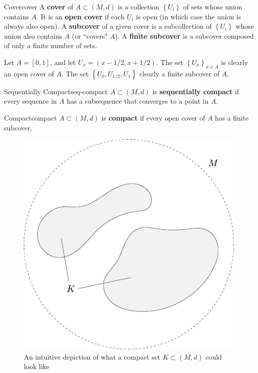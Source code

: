 \documentclass[10pt]{report}
\begin{document}
\begin{defn}{Cover}{cover}
	A \textbf{cover} of $A \subset (M,d)$ is a collection $\left\{ U_i \right\}$ of sets whose union contains $A$. It is an \textbf{open cover} if each $U_i$ is open (in which case the union is always also open). A \textbf{subcover} of a given cover is a subcollection of $\left\{ U_i \right\}$ whose union also contains $A$ (or ``covers" $A$). A \textbf{finite subcover} is a subcover composed of only a finite number of sets.
\end{defn}

\begin{ex}{}{}
	Let $A=[0,1]$, and let $U_x = (x-1/2, x+1/2)$. The set $\left\{ U_x \right\}_{x\in A}$ is clearly an open cover of $A$. The set $\left\{ U_0,U_{1/2},U_1 \right\}$ clearly a finite subcover of $A$.
\end{ex}

\begin{defn}{Sequentially Compact}{seq-compact}
	$A \subset (M,d)$ is \textbf{sequentially compact} if every sequence in $A$ has a subsequence that converges to a point in $A$.
\end{defn}

\begin{defn}{Compact}{compact}
	$A \subset (M,d)$ is \textbf{compact} if every open cover of $A$ has a finite subcover.
\end{defn}

\begin{figure}[H]
	\centering
	\includegraphics[scale=0.75]{fig/compact.pdf}
	\caption{An intuitive depiction of what a compact set $K \subset (M,d)$ could look like}
\end{figure}
\end{document}

